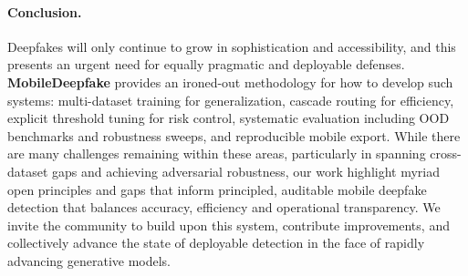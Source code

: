 \paragraph{Conclusion.}
Deepfakes will only continue to grow in sophistication and accessibility, and this presents an urgent need for equally pragmatic and deployable defenses. \textbf{MobileDeepfake} provides an ironed\hyp out methodology for how to develop such systems: multi\hyp dataset training for generalization, cascade routing for efficiency, explicit threshold tuning for risk control, systematic evaluation including OOD benchmarks and robustness sweeps, and reproducible mobile export. While there are many challenges remaining within these areas, particularly in spanning cross\hyp dataset gaps and achieving adversarial robustness, our work highlight myriad open principles and gaps that inform principled, auditable mobile deepfake detection that balances accuracy, efficiency and operational transparency. We invite the community to build upon this system, contribute improvements, and collectively advance the state of deployable detection in the face of rapidly advancing generative models.
